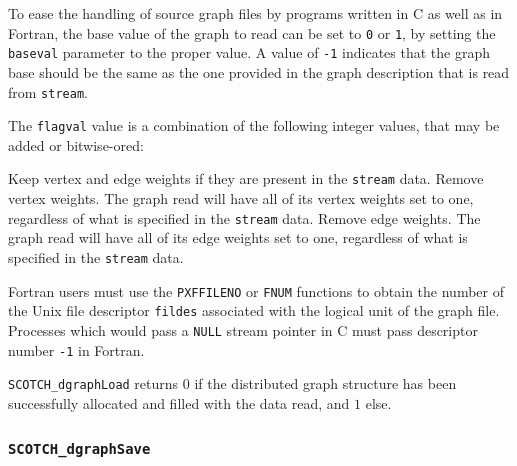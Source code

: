 \begin{itemize}
To ease the handling of source graph files by programs written in C as
well as in Fortran, the base value of the graph to read can be set
to {\tt 0} or {\tt 1}, by setting the {\tt baseval} parameter to the
proper value. A value of {\tt -1} indicates that the graph base should
be the same as the one provided in the graph description that is read
from {\tt stream}.

The {\tt flagval} value is a combination of the following integer values,
that may be added or bitwise-ored:
\begin{itemize}
\iteme[{\tt 0}]
Keep vertex and edge weights if they are present in the {\tt stream} data.
\iteme[{\tt 1}]
Remove vertex weights. The graph read will have all of its vertex weights
set to one, regardless of what is specified in the {\tt stream} data.
\iteme[{\tt 2}]
Remove edge weights. The graph read will have all of its edge weights
set to one, regardless of what is specified in the {\tt stream} data.
\end{itemize}

Fortran users must use the {\tt PXFFILENO} or {\tt FNUM} functions to
obtain the number of the Unix file descriptor {\tt fildes} associated
with the logical unit of the graph file. Processes which would pass a
{\tt NULL} stream pointer in C must pass descriptor number {\tt -1} in
Fortran.

\progret

{\tt SCOTCH\_dgraphLoad} returns $0$ if the distributed graph
structure has been successfully allocated and filled with the data
read, and $1$ else.
\end{itemize}

\subsubsection{{\tt SCOTCH\_dgraphSave}}

